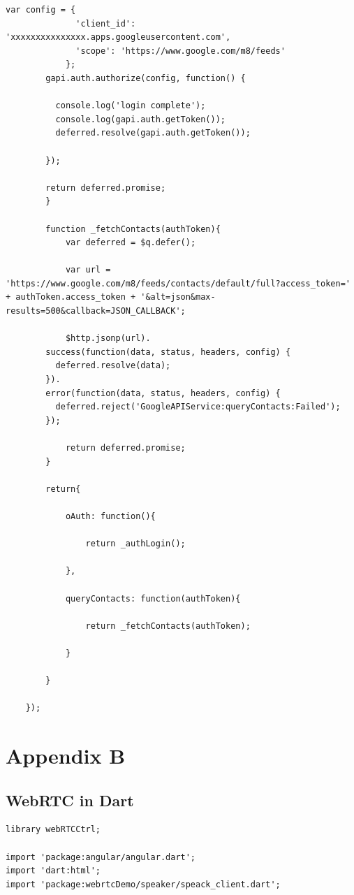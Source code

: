 \begin{appendices}
\begin{lstlisting}[caption={GoogleAPIService.js in application client},label={code:google_api}]
			var config = {
		      'client_id': 'xxxxxxxxxxxxxxx.apps.googleusercontent.com',
		      'scope': 'https://www.google.com/m8/feeds'
		    };
	    gapi.auth.authorize(config, function() {

	      console.log('login complete');
	      console.log(gapi.auth.getToken());
	      deferred.resolve(gapi.auth.getToken());

	    });

	    return deferred.promise;
		}

		function _fetchContacts(authToken){
			var deferred = $q.defer();

			var url = 'https://www.google.com/m8/feeds/contacts/default/full?access_token=' + authToken.access_token + '&alt=json&max-results=500&callback=JSON_CALLBACK';

			$http.jsonp(url).
	    success(function(data, status, headers, config) {
	      deferred.resolve(data);
	    }).
	    error(function(data, status, headers, config) {
	      deferred.reject('GoogleAPIService:queryContacts:Failed');
	    });

			return deferred.promise;
		}

		return{
			
			oAuth: function(){

				return _authLogin();
			
			},

			queryContacts: function(authToken){

				return _fetchContacts(authToken);

			}

		}

	});
\end{lstlisting}

\chapter{Appendix B}

\section{WebRTC in Dart} \label{research:dart_webrtcctrl}

\begin{lstlisting}[caption={WebRTCCtrl in Dart application client},label={code:dart_webrtcctrl}]
library webRTCCtrl;

import 'package:angular/angular.dart';
import 'dart:html';
import 'package:webrtcDemo/speaker/speack_client.dart';


\end{lstlisting}
\end{appendices}
